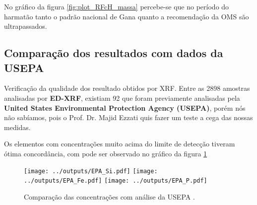 No gráfico da figura \ref{fig:plot_RFcH_massa} percebe-se que no período 
do harmatão tanto o padrão nacional de Gana quanto a recomendação da OMS 
são ultrapassados.



%    

\subsection{Comparação dos resultados com dados da USEPA}

Verificação da qualidade dos resultado obtidos por XRF.
Entre as 2898 amostras analisadas por \textbf{ED-XRF}, existiam 92 que foram 
previamente analisadas pela \textbf{United States Environmental Protection 
Agency (USEPA)}, porém nós não sabíamos, pois o Prof. Dr. Majid Ezzati quis 
fazer um teste a cega das nossas medidas. 

Os elementos com concentrações muito acima do limite de detecção tiveram ótima
concordância, com pode ser observado no gráfico da figura \ref{fig:epa} 

\begin{figure}[H]
  \centering
    \texttt{[image: ../outputs/EPA\_Si.pdf]}
    \texttt{[image: ../outputs/EPA\_Fe.pdf]}
    \texttt{[image: ../outputs/EPA\_P.pdf]}
  \caption{Comparação das concentrações com análise da USEPA \label{fig:epa}.}
\end{figure}
